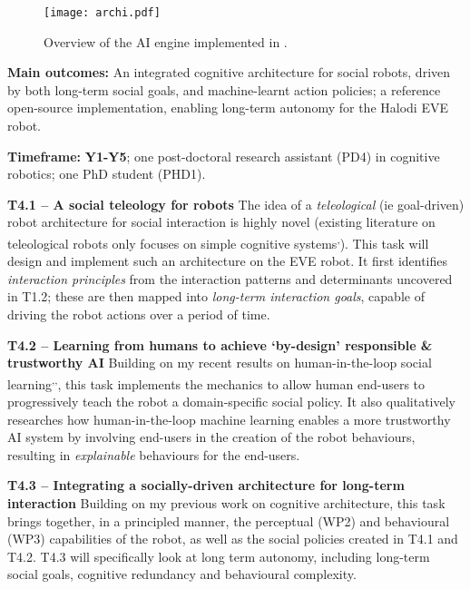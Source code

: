\begin{figure}[h!]
\centering
\texttt{[image: archi.pdf]}
\caption{Overview of the AI engine implemented in \project.}
\label{fig:archi}
\end{figure}


\begin{oframed}
    \textbf{Main outcomes:} An integrated cognitive architecture for social
    robots, driven by both long-term social goals, and machine-learnt action
    policies; a reference open-source implementation, enabling long-term
    autonomy for the Halodi EVE robot.

    \textbf{Timeframe:} \textbf{Y1-Y5}; one post-doctoral research assistant (PD4) in cognitive
    robotics; one PhD student (PHD1).

\end{oframed}

\textbf{T4.1 -- A social teleology for robots} The idea of a \emph{teleological}
(ie goal-driven) robot architecture for social interaction is highly novel
(existing literature on teleological robots only focuses on simple cognitive
systems\textsuperscript{,}).
This task will design and implement such an architecture on the EVE robot. It first
identifies \emph{interaction principles} from the interaction patterns and
determinants uncovered in T1.2; these are then mapped into \emph{long-term
interaction goals}, capable of driving the robot actions over a period of time.

\textbf{T4.2 -- Learning from humans to achieve `by-design' responsible \&
trustworthy AI} Building on my recent results on human-in-the-loop social
learning\textsuperscript{,}\textsuperscript{,},
this task implements the mechanics to allow human end-users to progressively
teach the robot a domain-specific social policy.  It also qualitatively
researches how human-in-the-loop machine learning enables a more trustworthy AI
system by involving end-users in the creation of the robot behaviours,
resulting in \emph{explainable} behaviours for the end-users.

\textbf{T4.3 -- Integrating a socially-driven architecture for long-term
interaction} Building on my previous work on cognitive
architecture, this task brings together, in
a principled manner, the perceptual (WP2) and behavioural (WP3) capabilities of
the robot, as well as the social policies created in T4.1 and T4.2. T4.3 will
specifically look at long term autonomy, including long-term social goals,
cognitive redundancy and behavioural complexity.

